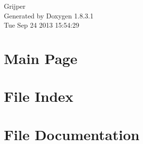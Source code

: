 \documentclass{book}
\begin{document}
\begin{titlepage}
\vspace*{7cm}
\begin{center}
{\Large Grijper }\\
\vspace*{1cm}
{\large Generated by Doxygen 1.8.3.1}\\
\vspace*{0.5cm}
{\small Tue Sep 24 2013 15:54:29}\\
\end{center}
\end{titlepage}
\clearemptydoublepage
{}
\tableofcontents
\clearemptydoublepage
{}
\chapter{Main Page}
\label{index}
\chapter{File Index}

\chapter{File Documentation}






\printindex
\end{document}
